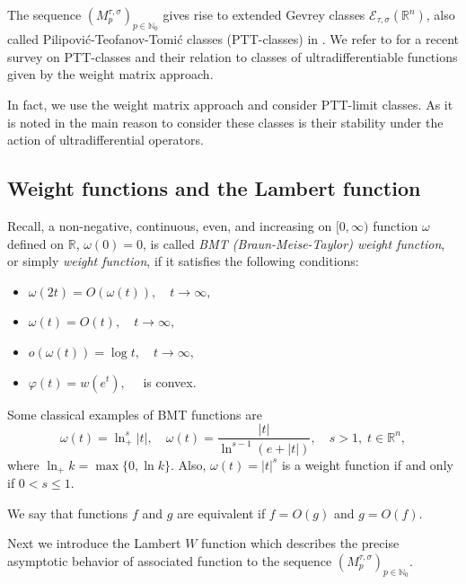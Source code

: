 \documentclass{article}
\theoremstyle{thmstyleone}
\theoremstyle{thmstyletwo}%
\theoremstyle{thmstylethree}%
\begin{document}
\par 

The sequence $(M_{p}^{\tau,\sigma})_{p\in\mathbb N_0}$ gives rise to 
extended Gevrey classes $\mathcal E_{\tau,\sigma}(\mathbb R ^n)$, also called 
Pilipovi\'c-Teofanov-Tomi\'c classes (PTT-classes) in \cite{Garrido-2,
Garrido-Lastra-Sanz}. 
We refer to \cite{TTZ2024} for a recent survey on PTT-classes and their relation to
classes of ultradifferentiable functions given by the weight matrix approach.

In fact, we use the weight matrix approach and consider PTT-limit classes.
As it is noted in \cite{Garrido-2} the main reason to consider 
these classes is their  stability under the action of ultradifferential operators.

\subsection{Weight functions and the Lambert function}

Recall, a non-negative, continuous, even, and increasing on $[0,\infty)$ function $\omega$ defined on $\mathbb R$, $\omega(0)=0$, is called \emph{BMT (Braun-Meise-Taylor) weight function}, or simply \emph{weight function}, if it satisfies the following conditions:
\begin{itemize}
\item[($\alpha$)] $\omega(2t)=O(\omega(t)),\quad t\to \infty,$
\vspace{0.1cm}
\item[($\beta$)] $ \omega(t)=O(t),\quad t\to\infty,$
\vspace{0.1cm}
\item[($\gamma$)] $o(\omega(t))=\log t,\quad t \to \infty,$
\vspace{0.1cm}
\item [($\delta$)] $\varphi(t)=w(e^t),\quad$ is convex.
\end{itemize} 

Some classical examples of BMT functions are
\begin{equation}
\label{BMTexamples}
\omega (t) = \ln^{s}_+ |t|,\quad \omega (t)=\frac{|t|}{\ln^{s-1} (e+|t|)},\quad s>1,\; t\in \mathbb R^n,
\end{equation} where $\ln_+ k=\max\{0,\ln k\}$. Also, $\omega (t)=|t|^s$ is a weight function if and only if $0<s\leq 1$.

We say that functions $f$ and $g$ are equivalent if $f=O(g)$ and $g=O(f)$.

Next we introduce the Lambert $W$ function which 
describes the precise asymptotic behavior of associated function to the sequence $(M_p^{\tau,\sigma})_{p \in \mathbb N_0} $.
\end{document}
